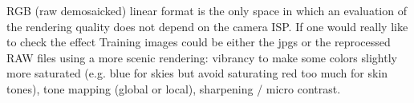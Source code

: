 RGB (raw demosaicked) linear format is the only space in which an evaluation of the rendering quality does not depend on the camera ISP.
If one would really like to check the effect Training images could be either the jpgs or the reprocessed RAW files using a more scenic rendering: vibrancy to make some colors slightly more saturated (e.g. blue for skies but avoid saturating red too much for skin tones), tone mapping (global or local), sharpening / micro contrast.
